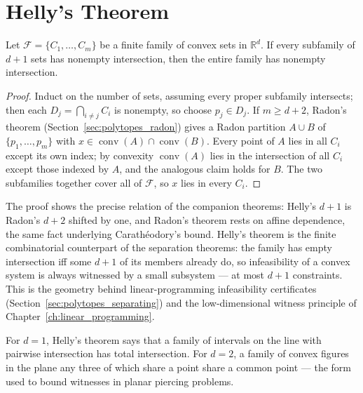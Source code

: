 
\section{Helly's Theorem}
\label{sec:polytopes_helly}

\begin{theorem}[Helly]\label{thm:polytopes_helly}
  Let $\mathcal{F} = \{C_1, \dots, C_m\}$ be a finite family of convex sets
  in $\mathbb{R}^d$. If every subfamily of $d + 1$ sets has nonempty
  intersection, then the entire family has nonempty intersection.
\end{theorem}

\begin{proof}
  Induct on the number of sets, assuming every proper subfamily intersects;
  then each $D_j = \bigcap_{i \neq j} C_i$ is nonempty, so choose
  $p_j \in D_j$. If $m \ge d + 2$, Radon's theorem
  (Section~\ref{sec:polytopes_radon}) gives a Radon partition $A \cup B$ of
  $\{p_1, \dots, p_m\}$ with $x \in \operatorname{conv}(A) \cap
  \operatorname{conv}(B)$. Every point of $A$ lies in all $C_i$ except its
  own index; by convexity $\operatorname{conv}(A)$ lies in the intersection
  of all $C_i$ except those indexed by $A$, and the analogous claim holds
  for $B$. The two subfamilies together cover all of $\mathcal{F}$, so $x$
  lies in every $C_i$.
\end{proof}

The proof shows the precise relation of the companion theorems: Helly's
$d+1$ is Radon's $d+2$ shifted by one, and Radon's theorem rests on affine
dependence, the same fact underlying Carath\'eodory's bound. Helly's
theorem is the finite combinatorial counterpart of the separation theorems:
the family has empty intersection iff some $d+1$ of its members already do,
so infeasibility of a convex system is always witnessed by a small
subsystem --- at most $d+1$ constraints. This is the geometry behind
linear-programming infeasibility certificates
(Section~\ref{sec:polytopes_separating}) and the low-dimensional witness
principle of Chapter~\ref{ch:linear_programming}.

\begin{example}
  For $d = 1$, Helly's theorem says that a family of intervals on the line
  with pairwise intersection has total intersection. For $d = 2$, a family
  of convex figures in the plane any three of which share a point share a
  common point --- the form used to bound witnesses in planar piercing
  problems.
\end{example}


